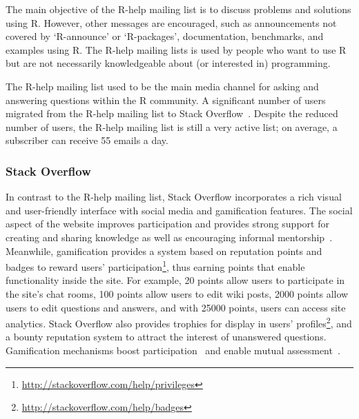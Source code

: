 \documentclass{sig-alternate-05-2015}
\begin{document}
	The main objective of the R-help mailing list is to discuss problems and solutions using R. 
	However, other messages are encouraged, such as announcements not covered by `R-announce' or `R-packages', documentation, benchmarks, and examples using R.
	The R-help mailing lists is used by people who want to use R but are not necessarily knowledgeable about (or interested in) programming.

	The R-help mailing list used to be the main media channel for asking and answering questions within the R community.
    A significant number of users migrated from the R-help mailing list to Stack Overflow~\cite{Vasilescu2014c}.
	Despite the reduced number of users, the R-help mailing list is still a very active list; on average, a subscriber can receive 55 emails a day.

\subsubsection{Stack Overflow}
\label{subsec:Rtag}

	In contrast to the R-help mailing list, Stack Overflow incorporates a rich visual and user-friendly interface with social media and gamification features.
	The social aspect of the website improves participation and provides strong support for creating and sharing knowledge as well as encouraging informal mentorship~\cite{Jenkins2009, Storey2014}.
	Meanwhile, gamification provides a system based on reputation points and badges to reward users' participation\footnote{\url{http://stackoverflow.com/help/privileges}}, thus earning points that enable functionality inside the site.
	For example, 20 points allow users to participate in the site's chat rooms, 100 points allow users to edit wiki posts, 2000 points allow users to edit questions and answers, and with 25000 points, users can access site analytics.
	Stack Overflow also provides trophies for display in users' profiles\footnote{\url{http://stackoverflow.com/help/badges}}, and a bounty reputation system to attract the interest of unanswered questions.
	Gamification mechanisms boost participation~\cite{Vasilescu2014} and enable mutual assessment~\cite{Singer2013}.
\end{document}
